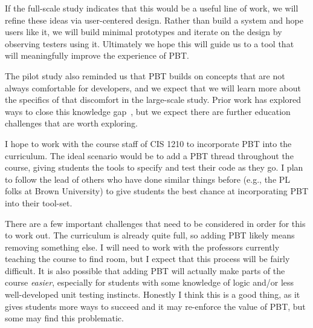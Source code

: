 If the full-scale study indicates that this would be a useful line of work, we
will refine these ideas via user-centered design. Rather than build a system and
hope users like it, we will build minimal prototypes and iterate on the design
by observing testers using it. Ultimately we hope this will guide us to a tool
that will meaningfully improve the experience of PBT.

\label{sec:ed}

The pilot study also reminded us that PBT builds on concepts that are not
always comfortable for developers, and we expect that we will learn more about
the specifics of that discomfort in the large-scale study.  Prior work has
explored ways to close this knowledge
gap~\cite{wrenn2021using,nelson2021automated}, but we expect there are further
education challenges that are worth exploring.

I hope to work with the course staff of CIS 1210 to incorporate PBT into the
curriculum. The ideal scenario would be to add a PBT thread throughout the
course, giving students the tools to specify and test their code as they go.  I
plan to follow the lead of others who have done similar things before (e.g., the
PL folks at Brown University) to give students the best chance at incorporating
PBT into their tool-set.

There are a few important challenges that need to be considered in order for
this to work out.  The curriculum is already quite full, so adding PBT likely
means removing something else. I will need to work with the professors currently
teaching the course to find room, but I expect that this process will be fairly
difficult. It is also possible that adding PBT will actually make parts of the
course {\em easier}, especially for students with some knowledge of logic and/or
less well-developed unit testing instincts. Honestly I think this is a good
thing, as it gives students more ways to succeed and it may re-enforce the value
of PBT, but some may find this problematic.

\label{sec:plan-of-work}


